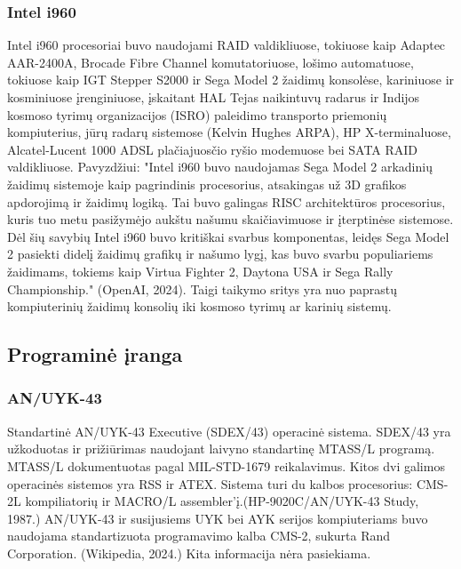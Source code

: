 \documentclass{article}
\begin{document}
\subsubsection{Intel i960}
Intel i960 procesoriai buvo naudojami RAID valdikliuose, tokiuose kaip Adaptec AAR-2400A, Brocade Fibre Channel komutatoriuose, lošimo automatuose, tokiuose kaip IGT Stepper S2000 ir Sega Model 2 žaidimų konsolėse, kariniuose ir kosminiuose įrenginiuose, įskaitant HAL Tejas naikintuvų radarus ir Indijos kosmoso tyrimų organizacijos (ISRO) paleidimo transporto priemonių kompiuterius, jūrų radarų sistemose (Kelvin Hughes ARPA), HP X-terminaluose, Alcatel-Lucent 1000 ADSL plačiajuosčio ryšio modemuose bei SATA RAID valdikliuose. Pavyzdžiui: "Intel i960 buvo naudojamas Sega Model 2 arkadinių žaidimų sistemoje kaip pagrindinis procesorius, atsakingas už 3D grafikos apdorojimą ir žaidimų logiką. Tai buvo galingas RISC architektūros procesorius, kuris tuo metu pasižymėjo aukštu našumu skaičiavimuose ir įterptinėse sistemose. Dėl šių savybių Intel i960 buvo kritiškai svarbus komponentas, leidęs Sega Model 2 pasiekti didelį žaidimų grafikų ir našumo lygį, kas buvo svarbu populiariems žaidimams, tokiems kaip Virtua Fighter 2, Daytona USA ir Sega Rally Championship." (OpenAI, 2024). Taigi taikymo sritys yra nuo paprastų kompiuterinių žaidimų konsolių iki kosmoso tyrimų ar karinių sistemų.
\subsection{Programinė įranga}
\subsubsection{AN/UYK-43}
Standartinė AN/UYK-43 Executive (SDEX/43) operacinė sistema. SDEX/43 yra
užkoduotas ir prižiūrimas naudojant laivyno standartinę MTASS/L programą. MTASS/L dokumentuotas pagal MIL-STD-1679 reikalavimus. Kitos dvi galimos operacinės sistemos yra RSS ir ATEX. Sistema turi du kalbos
procesorius: CMS-2L kompiliatorių ir MACRO/L assembler'į.(HP-9020C/AN/UYK-43 Study, 1987.) AN/UYK-43 ir susijusiems UYK bei AYK serijos kompiuteriams buvo naudojama standartizuota programavimo kalba CMS-2, sukurta Rand Corporation. (Wikipedia, 2024.) Kita informacija nėra pasiekiama.
\end{document}
